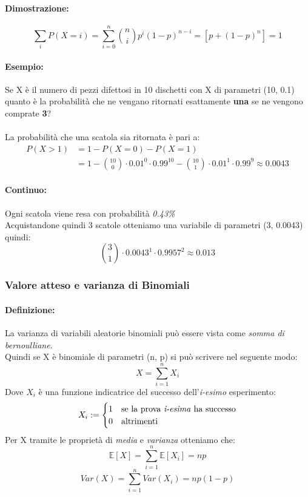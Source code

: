 \documentclass[]{article}
\newcommand{\ev}{\mathbb{E}[X]}
\renewcommand{\ev}[1]{\mathbb{E}[#1]}
\newcommand{\definizione}{\paragraph{Definizione:}}
\begin{document}
    \paragraph{Dimostrazione:}
    \[ \sum_{i}^{} P(X = i) = \sum_{i = 0}^{n} \binom{n}{i} p^i (1-p)^{n-i} = [p + (1 - p)^n] = 1 \]


    \paragraph{Esempio:} Se X è il numero di pezzi difettosi in 10 dischetti con X di parametri (10, 0.1) quanto è
    la probabilità che ne vengano ritornati esattamente \textbf{una} se ne vengono comprate \textbf{3}? \\ \\
    La probabilità che una scatola sia ritornata è pari a:
    \begin{equation*}
        \begin{split}
            P(X > 1) &= 1 - P(X = 0) - P(X = 1) \\
            & = 1 - \binom{10}{0} \cdot 0.01^0 \cdot 0.99^{10} - \binom{10}{1} \cdot 0.01^1 \cdot 0.99^9 \approx 0.0043
        \end{split}
    \end{equation*}
    \paragraph{Continuo:} Ogni scatola viene resa con probabilità \textit{0.43\%} \\
    Acquistandone quindi 3 scatole otteniamo una variabile di parametri (3, 0.0043) quindi:
    \[ \binom{3}{1} \cdot 0.0043^1 \cdot 0.9957^2 \approx 0.013 \]

    \subsubsection{Valore atteso e varianza di Binomiali}
    \definizione La varianza di variabili aleatorie binomiali può essere vista come \textit{somma di bernoulliane}. \\
    Quindi se X è binomiale di parametri (n, p) si può scrivere nel seguente modo:
    \[ X = \sum_{i = 1}^{n} X_i \]
    Dove $X_i$ è una funzione indicatrice del successo dell'\textit{i-esimo} esperimento:
    \begin{equation*}
        X_i :=
        \begin{cases}
            1 & \text{se la prova \textit{i-esima} ha successo} \\
            0 & \text{altrimenti}
        \end{cases}
    \end{equation*}
    Per X tramite le proprietà di \textit{media} e \textit{varianza} otteniamo che:
    \[ \ev{X} = \sum_{i = 1}^{n} \ev{X_i} = np \]
    \[ Var(X) = \sum_{i = 1}^{n} Var(X_i) = np(1 - p) \]
\end{document}
